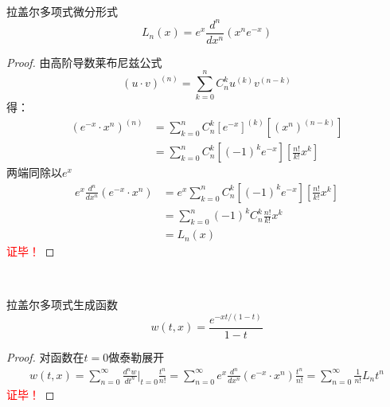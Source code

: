 		~~\\ 
	
	
		\begin{proposition}拉盖尔多项式微分形式
			\begin{equation*}
				L_n(x) =e^x \frac{d ^n}{d x^n} (x^n e^{-x})
			\end{equation*}	
		\end{proposition}
		\begin{proof}
			由高阶导数莱布尼兹公式 
			\begin{equation*}
				(u\cdot v) ^{(n)} =\sum_{k=0}^{n} C^k _n u^{(k) }v^{(n-k)} 
			\end{equation*}	
			得：
			\begin{equation*}
			\begin{split}
				(e^{-x}\cdot x^n) ^{(n)}&= \sum_{k=0}^{n} C^k _n [ e ^{-x}]^{(k)}   [(x^n)^{(n-k)}]\\
				&= \sum_{k=0}^{n} C^k _n [(-1)^k e ^{-x}]   [ \frac{n!}{k!} x^k]
			\end{split}		
			\end{equation*}	
		两端同除以$ e^x  $ 
			\begin{equation*}
				\begin{split}
					e^x \frac{d^n }{d x^n} (e^{-x}\cdot x^n) &=e^x \sum_{k=0}^{n} C^k _n [(-1)^k e ^{-x}]   [ \frac{n!}{k!}  x^k]\\
					&= \sum_{k=0}^{n} (-1)^k C^k _n \frac{n!}{k!}x^k  \\
					&=L_n (x)		
				\end{split}		
				\end{equation*}	
			\textcolor{red}{证毕！}
		\end{proof}
		~~\\ 
	
		\begin{proposition}拉盖尔多项式生成函数
			\begin{equation*}
				w(t,x) =\frac{e^{-xt/(1-t) } } {1-t}
			\end{equation*}	
		\end{proposition}
		\begin{proof}
			对函数在$t=0$做泰勒展开
			\begin{equation*}
			\begin{split}
				w(t,x) = \sum_{n=0}^{\infty} \frac{d^n w}{d t^n} |_{t=0} \frac{t^n}{n!}  = \sum_{n=0}^{\infty}  e^x \frac{d^n }{d x^n} (e^{-x}\cdot x^n) \frac{t^n}{n!}= \sum_{n=0}^{\infty} \frac{1}{n!} L_n t^n  
			\end{split}		
			\end{equation*}	
		\textcolor{red}{证毕！}
		\end{proof}

